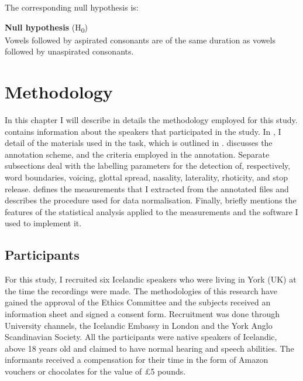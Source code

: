 \documentclass[11pt,a4paper,openany]{memoir}\usepackage[]{graphicx}\usepackage[]{color}
\begin{document}
The corresponding null hypothesis is:

\begin{exe}
\ex\label{h0} \textbf{Null hypothesis} (H\textsubscript{0}) \\
Vowels followed by aspirated consonants are of the same duration as vowels followed by unaspirated consonants.
\end{exe}








\chapter{Methodology}
In this chapter I will describe in details the methodology employed for this study.
 contains information about the speakers that participated in the study.
In , I detail  of the materials used in the task, which is outlined in .
 discusses the annotation scheme, and the criteria employed in the annotation.
Separate subsections deal with the labelling parameters for the detection of, respectively, word boundaries, voicing, glottal spread, nasality, laterality, rhoticity, and stop release.
 defines the measurements that I extracted from the annotated files and describes the procedure used for data normalisation.
Finally,  briefly mentions the features of the statistical analysis applied to the measurements and the software I used to implement it.

\section{Participants}
\label{s:participants}

For this study, I recruited six Icelandic speakers who were living in York (UK) at the time the recordings were made.
The methodologies of this research have gained the approval of the Ethics Committee and the subjects received an information sheet and signed a consent form.
Recruitment was done through University channels, the Icelandic Embassy in London and the York Anglo Scandinavian Society.
All the participants were native speakers of Icelandic, above 18 years old and claimed to have normal hearing and speech abilities.
The informants received a compensation for their time in the form of Amazon vouchers or chocolates for the value of £5 pounds.
\end{document}
